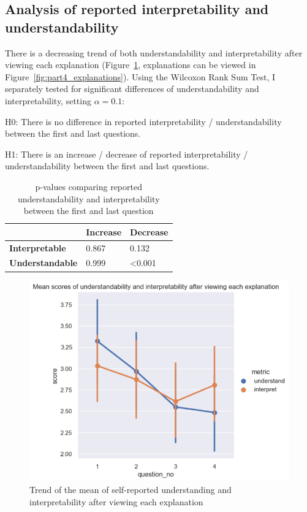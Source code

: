 \subsection{Analysis of reported interpretability and understandability}
\label{sec:interpret_understand}
There is a decreasing trend of both understandability and interpretability after viewing each explanation (Figure~\ref{fig:part3_trend}, explanations can be viewed in Figure~\ref{fig:part4_explanations}). Using the Wilcoxon Rank Sum Test, I separately tested for significant differences of understandability and interpretability, setting $\alpha = 0.1$: 

\bigskip

\noindent H0: There is no difference in reported interpretability / understandability between the first and last questions.

\bigskip

\noindent H1: There is an increase / decrease of reported interpretability / understandability between the first and last questions.

\bigskip

\begin{table}[!ht]
  \centering
  \begin{tabular}{l|l|l|}
  \cline{2-3}
                                                & \textbf{Increase} & \textbf{Decrease} \\ \hline
  \multicolumn{1}{|l|}{\textbf{Interpretable}} & 0.867             & 0.132             \\ \hline
  \multicolumn{1}{|l|}{\textbf{Understandable}}  & 0.999             & \cellcolor{red!25}\textless{}0.001  \\ \hline
  \end{tabular}
  \caption{p-values comparing reported understandability and interpretability between the first and last question}
  \label{tab:p_values_interpret_understand}
\end{table}

\begin{figure}[!ht]
  \centering
  \includegraphics[width=1\linewidth]{figures/part3.png}
  \caption{Trend of the mean of self-reported understanding and interpretability after viewing each explanation}
  \label{fig:part3_trend}
\end{figure}

